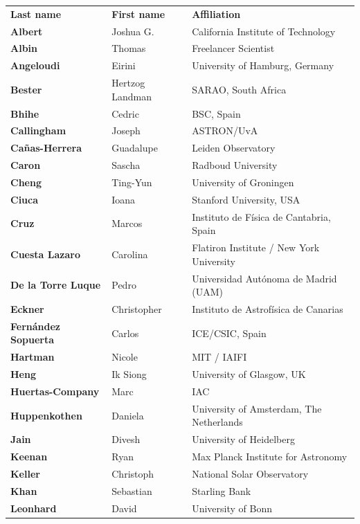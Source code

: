 \documentclass[9pt,a5paper,twoside]{extarticle}
\begin{document}
{\scriptsize
\setlength{\tabcolsep}{1.2mm}
\renewcommand{\arraystretch}{0.84}
\begin{tabularx}{\linewidth}{@{\hspace{1mm}}>{\bfseries\color{DeepBlue}}l l >{\raggedright\arraybackslash}X@{\hspace{1mm}}}
  \rowcolor{DeepBlue}\color{white}\bfseries Last name & \color{white}\bfseries First name & \color{white}\bfseries Affiliation\\
  Albert & Joshua G. & California Institute of Technology\\
  Albin & Thomas & Freelancer Scientist\\
  Angeloudi & Eirini & University of Hamburg, Germany\\
  Bester & Hertzog Landman & SARAO, South Africa\\
  Bhihe & Cedric & BSC, Spain\\
  Callingham & Joseph & ASTRON/UvA\\
  Cañas-Herrera & Guadalupe & Leiden Observatory\\
  Caron & Sascha & Radboud University\\
  Cheng & Ting-Yun & University of Groningen\\
  Ciuca & Ioana & Stanford University, USA\\
  Cruz & Marcos & Instituto de Física de Cantabria, Spain\\
  Cuesta Lazaro & Carolina & Flatiron Institute / New York University\\
  De la Torre Luque & Pedro & Universidad Autónoma de Madrid (UAM)\\
  Eckner & Christopher & Instituto de Astrofísica de Canarias\\
  Fernández Sopuerta & Carlos & ICE/CSIC, Spain\\
  Hartman & Nicole & MIT / IAIFI\\
  Heng & Ik Siong & University of Glasgow, UK\\
  Huertas-Company & Marc & IAC\\
  Huppenkothen & Daniela & University of Amsterdam, The Netherlands\\
  Jain & Divesh & University of Heidelberg\\
  Keenan & Ryan & Max Planck Institute for Astronomy\\
  Keller & Christoph & National Solar Observatory\\
  Khan & Sebastian & Starling Bank\\
  Leonhard & David & University of Bonn\\

\end{tabularx}}
\end{document}
